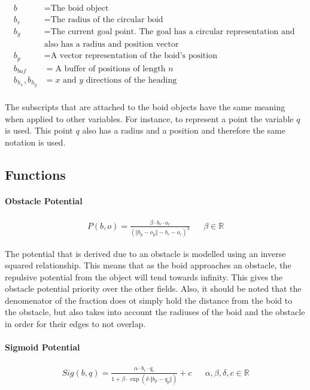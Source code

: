 \documentclass[12pt]{article}
\begin{document}
\begin{align*}
b &= \text{The boid object} \\
b_r &= \text{The radius of the circular boid} \\
b_g &= \text{The current goal point. The goal has a circular representation and } \\
& \text{also has a radius and position vector} \\
b_p &= \text{A vector representation of the boid's position} \\ 
b_{buf} &= \text{A buffer of positions of length } n \\
b_{h_x}, b_{h_y} &= x \text{ and } y \text{ directions of the heading} \\
\end{align*}

The subscripts that are attached to the boid objects have the same meaning when applied to other variables. For instance, to represent a point the variable \(q\) is used. This point \(q\) also has a radius and a position and therefore the same notation is used.

\subsection{Functions}
\paragraph{Obstacle Potential}
\begin{align*}
P(b, o) = \frac{\beta \cdot b_r \cdot o_r}{(\Vert b_p - o_p \Vert - b_r - o_r)^2} && \beta \in \mathbb{R}
\end{align*}

The potential that is derived due to an obstacle is modelled using an inverse squared relationship. This means that as the boid approaches an obstacle, the repulsive potential from the object will tend towards infinity. This gives the obstacle potential priority over the other fields. Also, it should be noted that the denomenator of the fraction does ot simply hold the distance from the boid to the obstacle, but also takes into account the radiuses of the boid and the obstacle in order for their edges to not overlap.

\paragraph{Sigmoid Potential}
\begin{align*}
Sig(b, q) = \frac{\alpha \cdot b_r \cdot q_r}{1 + \beta \cdot \exp(\delta \cdot \Vert b_p - q_p \Vert)} + c && \alpha, \beta, \delta, c \in \mathbb{R}
\end{align*}
\end{document}
